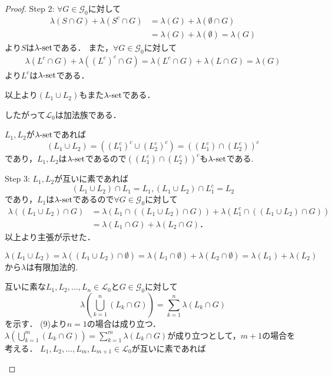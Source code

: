 \documentclass{jsarticle}
\begin{document}
\begin{proof}
Step 2:
$\forall G\in\mathcal{G}_0$に対して
\begin{align}
    \lambda(S\cap G)+\lambda(S^c\cap G)&=\lambda(G)+\lambda(\emptyset\cap G) \nonumber \\
    &=\lambda(G)+\lambda(\emptyset)=\lambda(G) \nonumber 
\end{align}
より$S$は$\lambda{\rm \text{-}set}$である．
また，$\forall G\in\mathcal{G}_0$に対して
\begin{align}
    \lambda(L^c\cap G)+\lambda((L^c)^c\cap G)=\lambda(L^c\cap G)+\lambda(L\cap G) =\lambda(G) \nonumber  
\end{align}
より$L^c$は$\lambda{\rm \text{-}set}$である．

以上より$(L_1\cup L_2)$もまた$\lambda{\rm \text{-}set}$である．

したがって$\mathcal{L}_0$は加法族である．

\begin{itembox}{}
    $L_1,L_2$が$\lambda{\rm \text{-}set}$であれば
    \begin{equation}
        (L_1\cup L_2)=((L_1^c)^c\cup (L_2^c)^c)=((L_1^c) \cap (L_2^c))^c \nonumber
    \end{equation}
    であり，$L_1,L_2$は$\lambda{\rm \text{-}set}$であるので$((L_1^c) \cap (L_2^c))^c$も$\lambda{\rm \text{-}set}$である.
\end{itembox}

Step 3:
$L_1,L_2$が互いに素であれば
\begin{equation}
    (L_1\cup L_2)\cap L_1=L_1,(L_1\cup L_2)\cap L_1^c=L_2 \nonumber
\end{equation}
であり，$L_1$は$\lambda{\rm \text{-}set}$であるので$\forall G\in\mathcal{G}_0$に対して
\begin{align}
    \lambda((L_1\cup L_2)\cap G)&=\lambda(L_1\cap ((L_1\cup L_2)\cap G))+\lambda(L_1^c\cap ((L_1\cup L_2)\cap G)) \nonumber \\
    &=\lambda(L_1\cap G)+\lambda(L_2\cap G) ．
\end{align}
以上より主張が示せた．

\begin{itembox}{}
    \begin{equation}
        \lambda(L_1\cup L_2)=\lambda((L_1\cup L_2)\cap \emptyset)=\lambda(L_1\cap \emptyset)+\lambda(L_2\cap \emptyset)=\lambda(L_1)+\lambda(L_2)　\nonumber
    \end{equation}
    から$\lambda$は有限加法的.
\end{itembox}

\begin{itembox}{}
    互いに素な$L_1,L_2,\dots,L_n\in\mathcal{L}_0$と$G\in\mathcal{G}_0$に対して
    \begin{equation}
        \lambda\left( \bigcup_{k=1}^n (L_k\cap G) \right) = \sum_{k=1}^n \lambda(L_k\cap G) \nonumber 
    \end{equation}
    を示す．
    (9)より$n=1$の場合は成り立つ．
    $\lambda\left( \bigcup_{k=1}^m (L_k\cap G) \right) = \sum_{k=1}^m \lambda(L_k\cap G)$が成り立つとして，$m+1$の場合を考える．
    $L_1,L_2,\dots,L_m,L_{m+1}\in\mathcal{L}_0$が互いに素であれば
    

\end{itembox}
\end{proof}
\end{document}
